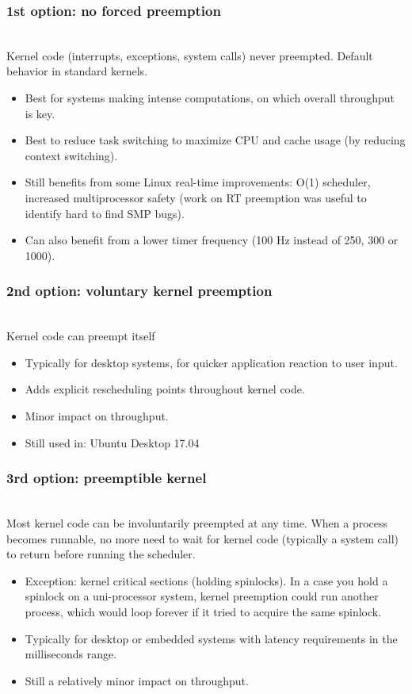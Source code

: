 \begin{frame}
  \frametitle{1st option: no forced preemption}
  \\
  Kernel code (interrupts, exceptions, system calls) never preempted.
  Default behavior in standard kernels.
  \begin{itemize}
  \item Best for systems making intense computations, on which overall
    throughput is key.
  \item Best to reduce task switching to maximize CPU and cache usage
    (by reducing context switching).
  \item Still benefits from some Linux real-time improvements: O(1)
    scheduler, increased multiprocessor safety (work on RT preemption
    was useful to identify hard to find SMP bugs).
  \item Can also benefit from a lower timer frequency (100 Hz instead
    of 250, 300 or 1000).
  \end{itemize}
\end{frame}

\begin{frame}
  \frametitle{2nd option: voluntary kernel preemption}
  \\
  Kernel code can preempt itself
  \begin{itemize}
  \item Typically for desktop systems, for quicker application
    reaction to user input.
  \item Adds explicit rescheduling points throughout kernel code.
  \item Minor impact on throughput.
  \item Still used in: Ubuntu Desktop 17.04
  \end{itemize}
\end{frame}

\begin{frame}
  \frametitle{3rd option: preemptible kernel}
  \\
  Most kernel code can be involuntarily preempted at any time.  When a
  process becomes runnable, no more need to wait for kernel code
  (typically a system call) to return before running the scheduler.
  \begin{itemize}
  \item Exception: kernel critical sections (holding spinlocks).
    In a case you hold a spinlock on a uni-processor system, kernel preemption
    could run another process, which would loop forever if it
    tried to acquire the same spinlock.
  \item Typically for desktop or embedded systems with latency
    requirements in the milliseconds range.
  \item Still a relatively minor impact on throughput.
  \end{itemize}
\end{frame}

